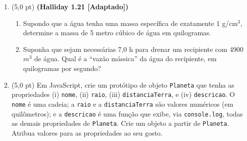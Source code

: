\documentclass[12pt,a4paper,oneside]{article}
\begin{document}
\begin{enumerate}

	\item (5,0 pt) {\bf (Halliday 1.21  [Adaptado])} 
	\begin{enumerate}
		\item Supondo que a água tenha uma massa específica de exatamente 1 g/$\mbox{cm}^3$, determine a massa de 5 metro cúbico de água em quilogramas.
		\item Suponha que sejam necessárias 7,0 h para drenar um recipiente com 4900 $m^3$ de água. Qual é a ``vazão mássica'' da água do recipiente, em quilogramas por segundo?
	\end{enumerate}
	
	\item (5,0 pt) Em JavaScript, crie um protótipo de objeto {\tt Planeta} que tenha as propriedades (i) {\tt nome}, (ii) {\tt raio}, (iii) {\tt distanciaTerra}, e (iv) {\tt descricao}. O {\tt nome} é uma cadeia; a {\tt raio} e a {\tt distanciaTerra} são valores numéricos (em quilômetros); e a {\tt descricao} é uma função que exibe, via {\tt console.log}, todas as demais propriedades de {\tt Planeta}. Crie um objeto a partir de {\tt Planeta}. Atribua valores para as proprieda\-des ao seu gosto.
	
	\end{enumerate}
\end{document}
